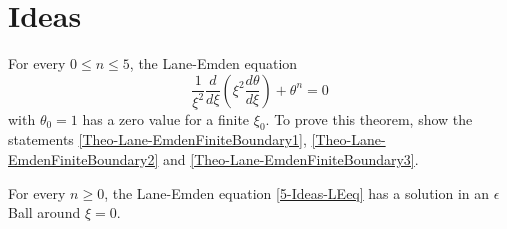 \section{Ideas}
\begin{theorem}
	\label{Theo-Lane-EmdenFiniteBoundary}
	For every $0\leq n\leq5$, the Lane-Emden equation
	\begin{equation}
		\frac{1}{\xi^2}\frac{d}{d\xi}\left(\xi^2\frac{d\theta}{d\xi}\right)+\theta^n=0
		\label{5-Ideas-LEeq}
	\end{equation}
	with $\theta_0=1$ has a zero value for a finite $\xi_0$. To prove this theorem, show the statements \ref{Theo-Lane-EmdenFiniteBoundary1}, 
	\ref{Theo-Lane-EmdenFiniteBoundary2} and \ref{Theo-Lane-EmdenFiniteBoundary3}.
\end{theorem}
\begin{theorem}
	\label{Theo-Lane-EmdenFiniteBoundary1}
	For every $n\geq0$, the Lane-Emden equation \ref{5-Ideas-LEeq} has a solution in an $\epsilon$ Ball around $\xi=0$.
\end{theorem}
